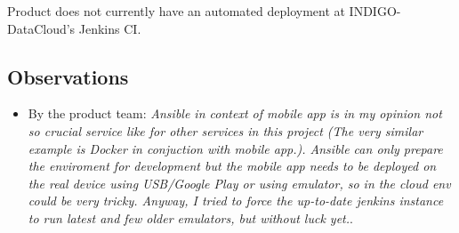 \documentclass[a4wide,11pt]{article}
\begin{document}
Product does not currently have an automated deployment at INDIGO-DataCloud's Jenkins CI.

\subsection{Observations}
\begin{itemize}
        \item By the product team: \textit{Ansible in context of mobile app is in my opinion not so crucial service like for other services in this project (The very similar example is Docker in conjuction with mobile app.). Ansible can only prepare the enviroment for development but the mobile app needs to be deployed on the real device using USB/Google Play or using emulator, so in the cloud env could be very tricky. Anyway, I tried to force the up-to-date jenkins instance to run latest and few older emulators, but without luck yet.}.
    \end{itemize}


\newpage

\end{document}
